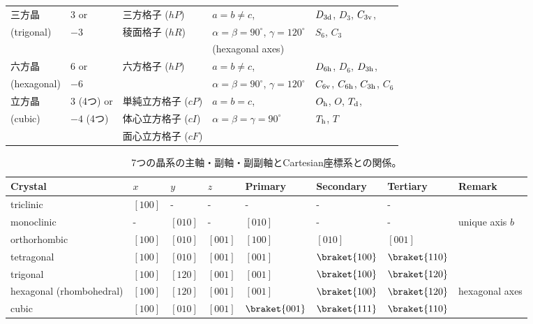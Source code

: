 \documentclass[11pt]{easymemo}
\begin{document}
\begin{table}[h!]
\begin{tabular}{lllll}
    三方晶         & $3$ or       & 三方格子 ($hP$)     & $a=b\ne c$,                                       & $D_{\rm 3d}$, $D_{3}$, $C_{\rm 3v}$,              \\
    (trigonal)     & $-3$         & 稜面格子 ($hR$)     & $\alpha=\beta= 90^{\circ}$, $\gamma=120^{\circ}$  & $S_{6}$, $C_{3}$                                  \\
                   &              &                     & (hexagonal axes)                                  &                                                   \\ \hline
    六方晶         & $6$ or       & 六方格子 ($hP$)     & $a=b\ne c$,                                       & $D_{\rm 6h}$, $D_{6}$, $D_{\rm 3h}$,              \\
    (hexagonal)    & $-6$         &                     & $\alpha=\beta= 90^{\circ}$, $\gamma=120^{\circ}$  & $C_{\rm 6v}$, $C_{\rm 6h}$, $C_{\rm 3h}$, $C_{6}$ \\ \hline
    立方晶         & $3$ (4つ) or & 単純立方格子 ($cP$) & $a=b=c$,                                          & $O_{\rm h}$, $O$, $T_{\rm d}$,                    \\
    (cubic)        & $-4$ (4つ)   & 体心立方格子 ($cI$) & $\alpha=\beta=\gamma=90^{\circ}$                  & $T_{\rm h}$, $T$                                  \\
                   &              & 面心立方格子 ($cF$)                                                                                                         \\
    \hline\hline
  \end{tabular}
\end{table}

\begin{table}[h!]
\caption{7つの晶系の主軸・副軸・副副軸とCartesian座標系との関係。
\label{tbl:abc}}
\begin{tabular}{llllllll} \hline\hline
Crystal & $x$ & $y$ & $z$ & Primary & Secondary & Tertiary & Remark \\ \hline
triclinic & $[100]$ & - & - & - & - & - \\
monoclinic & - & $[010]$ & - & $[010]$ & - & - & unique axis $b$ \\
orthorhombic & $[100]$ & $[010]$ & $[001]$ & $[100]$ & $[010]$ & $[001]$ & \\
tetragonal & $[100]$ & $[010]$ & $[001]$ & $[001]$ & $\braket{100}$ & $\braket{110}$ & \\
trigonal & $[100]$ & $[120]$ & $[001]$ & $[001]$ & $\braket{100}$ & $\braket{120}$ & \\
hexagonal (rhombohedral) & $[100]$ & $[120]$ & $[001]$ & $[001]$ & $\braket{100}$ & $\braket{120}$ & hexagonal axes \\
cubic & $[100]$ & $[010]$ & $[001]$ & $\braket{001}$ & $\braket{111}$ & $\braket{110}$ \\ \hline\hline
\end{tabular}
\end{table}
\end{document}

